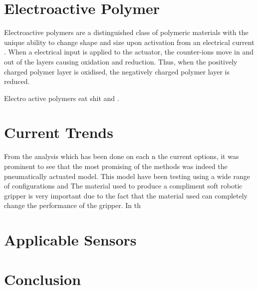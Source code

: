 \documentclass[11pt]{article}
\begin{document}
\section{Electroactive Polymer}
Electroactive polymers are a distinguished class of polymeric materials with the unique ability to change shape and size upon activation from an electrical current \cite{pillay2014review}. When a electrical input is applied to the actuator, the counter-ions move in and out of the layers causing oxidation and reduction. Thus, when the positively charged polymer layer is oxidised, the negatively charged polymer layer is reduced.




Electro active polymers eat shit \cite{mutlu2013electroactive} and \cite{pillay2014review}.
\section{Current Trends }
From the analysis which has been done on each n the current options, it was prominent to see that the most promising of the methods was indeed the pneumatically actuated model. This model have been testing using a wide range of configurations and
The material used to produce a compliment soft robotic gripper is very important due to the fact that the material used can completely change the performance of the gripper. In th
\section{Applicable Sensors}
\section{Conclusion}


\end{document}

